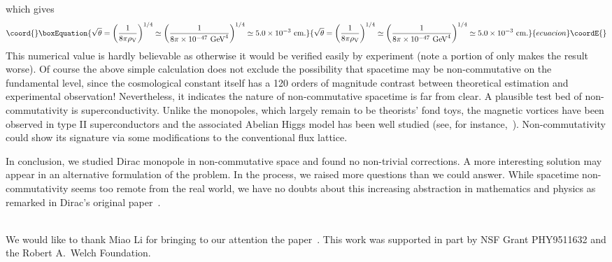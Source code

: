 \documentclass[a4paper,12pt]{article}
\begin{document}
\vskip -0.5cm
\noindent which gives
\begin{equation}\coord{}\boxEquation{
\sqrt{\theta}=\left(\frac{1}{8\pi \rho_{\rm V}}\right)^{1/4}\simeq 
          \left(\frac{1}{8\pi \times 10^{-47}\,\,\mathrm{GeV}^4}\right)^{1/4}
          \simeq 5.0\times 10^{-3}\,\,\mathrm{cm}. 
}{
\sqrt{\theta}=\left(\frac{1}{8\pi \rho_{\rm V}}\right)^{1/4}\simeq 
          \left(\frac{1}{8\pi \times 10^{-47}\,\,\mathrm{GeV}^4}\right)^{1/4}
          \simeq 5.0\times 10^{-3}\,\,\mathrm{cm}. 
}{ecuacion}\coordE{}\end{equation}
This numerical value is hardly believable as otherwise it 
would be verif\mbox{}ied
easily by experiment (note a portion of \coordHE{} only makes the
result worse). Of course the above simple calculation does not exclude
the possibility that spacetime may be non-commutative on the fundamental
level, since the cosmological constant itself has a 120 orders of magnitude
contrast between theoretical estimation and experimental observation!
Nevertheless, it indicates the nature of non-commutative spacetime is far
from clear. A plausible test bed of non-commutativity is superconductivity.
Unlike the monopoles, which largely remain to be theorists' fond toys,
the magnetic vortices have been observed in type II superconductors and 
the associated Abelian Higgs model has been well studied (see, 
for instance,~\cite{jt}). Non-commutativity could show its signature via
some modif\mbox{}ications to the conventional f\mbox{}lux lattice.

In conclusion, we studied Dirac monopole in non-commutative space and
found no non-trivial corrections. A more interesting solution may appear
in an alternative formulation of the problem. In the process, we raised
more questions than we could answer. While spacetime non-commutativity 
seems too remote from the real world, we have no doubts about this 
increasing abstraction in mathematics and physics as remarked in Dirac's
original paper~\cite{pd}.    

\vskip 1cm
\\

\noindent We would like to thank Miao Li for bringing to our attention the 
paper~\cite{dl}. This work was supported in part by NSF Grant PHY9511632 
and the Robert A.~Welch Foundation.
\end{document}
